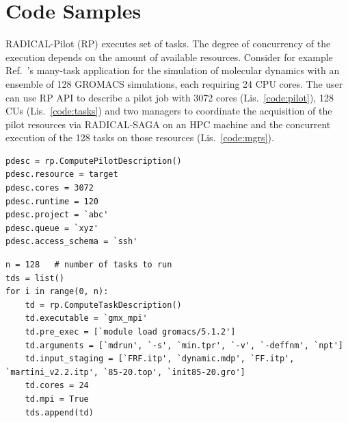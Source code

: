 \documentclass[preprint,12pt, a4paper]{elsarticle}
\begin{document}
\section*{Code Samples}\label{sec:metadata}

RADICAL-Pilot (RP) executes set of tasks. The degree of concurrency of the
execution depends on the amount of available resources. Consider for example
Ref.~\cite{balasubramanian2016extasy}'s many-task application for the simulation
of molecular dynamics with an ensemble of 128 GROMACS simulations, each
requiring 24 CPU cores. The user can use RP API to describe a pilot job with
3072 cores (Lis.~\ref{code:pilot}), 128 CUs (Lis.~\ref{code:tasks}) and two
managers to coordinate the acquisition of the pilot resources via RADICAL-SAGA
on an HPC machine and the concurrent execution of the 128 tasks on those
resources (Lis.~\ref{code:mgrs}).

\begin{lstlisting}
pdesc = rp.ComputePilotDescription()
pdesc.resource = target
pdesc.cores = 3072
pdesc.runtime = 120
pdesc.project = `abc'
pdesc.queue = `xyz'
pdesc.access_schema = `ssh'
\end{lstlisting}

\begin{lstlisting}
n = 128   # number of tasks to run
tds = list()
for i in range(0, n):
    td = rp.ComputeTaskDescription()
    td.executable = `gmx_mpi'
    td.pre_exec = [`module load gromacs/5.1.2']
    td.arguments = [`mdrun', `-s', `min.tpr', `-v', `-deffnm', `npt']
    td.input_staging = [`FRF.itp', `dynamic.mdp', `FF.itp', `martini_v2.2.itp', `85-20.top', `init85-20.gro']
    td.cores = 24
    td.mpi = True
    tds.append(td)
\end{lstlisting}
\end{document}
